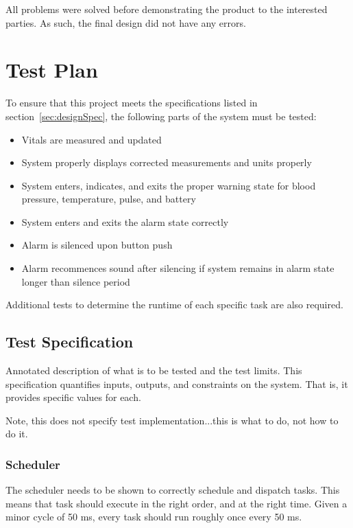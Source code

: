 \documentclass[12pt]{article} %
\begin{document}
All problems were solved before demonstrating the product to the interested parties. As such, the final design did not have any errors.

\section{Test Plan}

To ensure that this project meets the specifications listed in 
section~\ref{sec:designSpec}, the following parts of the system must be 
tested: 

\begin{itemize}
	\item Vitals are measured and updated
	\item System properly displays corrected measurements and units properly
	\item System enters, indicates, and exits the proper warning state for blood pressure, temperature, pulse, and battery
	\item System enters and exits the alarm state correctly
	\item Alarm is silenced upon button push
	\item Alarm recommences sound after silencing if system remains in alarm state longer than silence period
\end{itemize}

Additional tests to determine the runtime of each specific task are also required.

\subsection{Test Specification}

Annotated description of what is to be tested and the test limits.  This specification quantifies inputs, outputs, and constraints on the system.  That is, it provides specific values for each. 

Note, this does not specify test implementation...this is what to do, not how to do it.

\subsubsection{Scheduler}
The scheduler needs to be shown to correctly schedule and dispatch tasks.  This means that task should execute in the right order, and at the right time.  Given a minor cycle of 50 ms, every task should run roughly once every 50 ms.  
\end{document}
